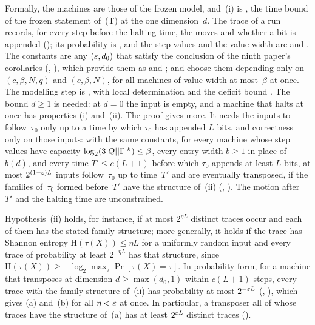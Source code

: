\begin{outline}
Formally, the machines are those of the frozen model, and~(i) is , the time bound of the
frozen statement of~(T) at the one dimension~$d$. The trace of a run records, for every step before the halting time,
the moves and whether a bit is appended (); its probability is , and
the step values and the value width are  and . The constants are
any $(\varepsilon,d_0)$ that satisfy the conclusion of the ninth paper's corollaries (,
), which provide them as
 and ;
 and  choose them depending only
on $(c,\beta,N,q)$ and $(c,\beta,N)$, for all machines of value width at most~$\beta$ at once. The modelling step is , with local
determination  and the deficit bound .
The bound $d\ge1$ is needed: at $d=0$ the input is empty, and a machine that halts at once has properties (i) and~(ii).
The proof gives more. It needs the inputs to follow~$\tau_0$ only up to a time by which $\tau_0$ has appended $L$ bits,
and correctness only on those inputs: with the same constants, for every machine whose step values have capacity
$\log_2(3\lvert Q \rvert\lvert \Gamma \rvert^k)\le\beta$, every entry width $b\ge1$ in place of $b(d)$, and every time $T'\le c(L+1)$
before which $\tau_0$ appends at least $L$ bits, at most $2^{(1-\varepsilon)L}$ inputs
follow~$\tau_0$ up to time~$T'$ and are eventually transposed, if the families of~$\tau_0$ formed before~$T'$ have the
structure of~(ii) (, ). The motion after~$T'$
and the halting time are unconstrained.
\end{outline}

Hypothesis~(ii) holds, for instance, if at most $2^{\eta L}$ distinct traces occur and each of them has the stated family
structure; more generally, it holds if the trace has Shannon entropy $\mathrm H(\tau(X))\le\eta L$ for a uniformly random
input and every trace of probability at least $2^{-\eta L}$ has that structure, since
$\mathrm H(\tau(X))\ge-\log_2\max_{\tau}\Pr[\tau(X)=\tau]$. In probability form, for a machine that transposes at
dimension $d\ge\max(d_0,1)$ within $c(L+1)$ steps, every trace with the family structure of~(ii) has probability at most
$2^{-\varepsilon L}$ (, ), which gives (a) and~(b) for all
$\eta<\varepsilon$ at once. In particular, a transposer all of whose traces have the structure of~(a) has at least $2^{\varepsilon L}$
distinct traces ().

